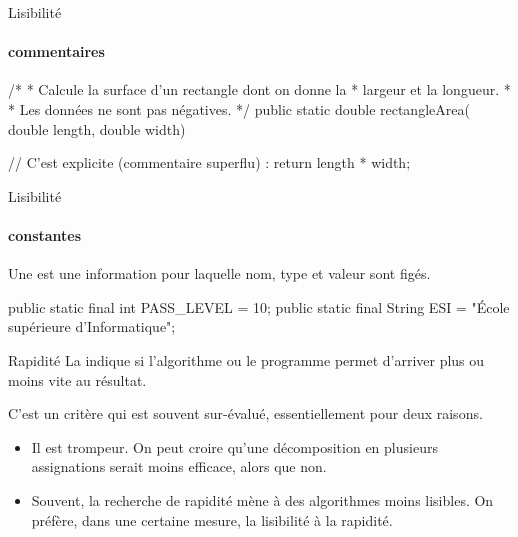 \begin{hideedit}
\begin{frame}[fragile]{Lisibilité}
  \framesubtitle{commentaires}
  \begin{java}
/*
 * Calcule la surface d'un rectangle dont on donne la
 * largeur et la longueur.
 *
 * Les données ne sont pas négatives.
 */
public static double rectangleArea(
    double length, double width) {

  // C'est explicite (commentaire superflu) :
  return length * width;
}
  \end{java}
\end{frame}

\begin{frame}[fragile]{Lisibilité}
  \framesubtitle{constantes}
  Une  est une information pour laquelle nom, type et
  valeur sont figés.
  \vfill
  \begin{java}
public static final int PASS_LEVEL = 10;
public static final String ESI =
    "École supérieure d'Informatique";
  \end{java}
\end{frame}

\begin{frame}{Rapidité}
  La  indique si l’algorithme ou le programme permet
  d’arriver plus ou moins vite au résultat.

  \pause
  C’est un critère qui est souvent sur-évalué,
  essentiellement pour deux raisons.
  \begin{itemize}[<+->]
    \item Il est trompeur. On peut croire qu'une décomposition en plusieurs
      assignations serait moins efficace, alors que non.
    \item Souvent, la recherche de rapidité mène à des algorithmes moins
      lisibles. On préfère, dans une certaine mesure, la lisibilité à la
      rapidité.
  \end{itemize}


\end{frame}
\end{hideedit}

